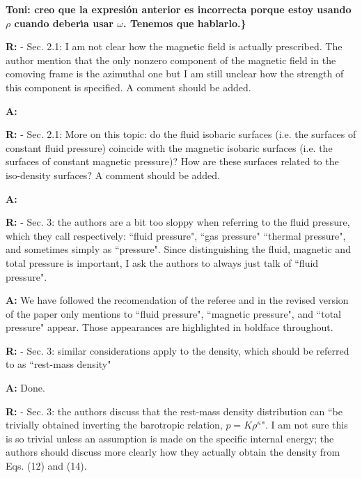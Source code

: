 \documentclass{article}
\begin{document}
{\bf Toni: creo que la expresi\'on anterior es incorrecta porque estoy usando $\rho$ cuando deber\'{\i}a usar $\omega$. Tenemos que
hablarlo.\}


\bigskip

{\bf R:} - Sec. 2.1: I am not clear how the magnetic field is actually
prescribed. The author mention that the only nonzero component of
the magnetic field in the comoving frame is the azimuthal one but I am
still unclear how the strength of this component is specified. A
comment should be added.

\bigskip

{\bf A:} 

\bigskip

{\bf R:} - Sec. 2.1: More on this topic: do the fluid isobaric surfaces (i.e. the
surfaces of constant fluid pressure) coincide with the magnetic
isobaric surfaces (i.e. the surfaces of constant magnetic pressure)?
How are these surfaces related to the iso-density surfaces? A comment
should be added.

\bigskip

{\bf A:} 

\bigskip

{\bf R:} - Sec. 3: the authors are a bit too sloppy when referring to the fluid
pressure, which they call respectively: ``fluid pressure", ``gas
pressure" ``thermal pressure", and sometimes simply as ``pressure". Since
distinguishing the fluid, magnetic and total pressure is important, I
ask the authors to always just talk of ``fluid pressure".

\bigskip

{\bf A:} We have followed the recomendation of the referee and in the revised version
of the paper only mentions to ``fluid pressure", ``magnetic pressure", and 
``total pressure" appear. Those appearances are highlighted in boldface
throughout.

\bigskip

{\bf R:} - Sec. 3: similar considerations apply to the density, which should
be referred to as ``rest-mass density"

\bigskip

{\bf A:} Done.

\bigskip

{\bf R:} - Sec. 3: the authors discuss that the rest-mass density distribution can
``be trivially obtained inverting the barotropic relation, $p = K
\rho^{\kappa}$". I am not sure this is so trivial unless an assumption is
made on the specific internal energy; the authors should discuss more
clearly how they actually obtain the density from Eqs. (12) and (14).

}
\end{document}
